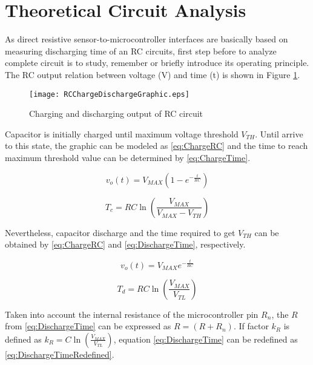 \section{Theoretical Circuit Analysis}\label{S:Res:Analysis}
As direct resistive sensor-to-microcontroller interfaces are basically based on measuring discharging time of an RC circuits, first step before to analyze complete circuit is to study, remember or briefly introduce its operating principle. The RC output relation between voltage (V) and time (t) is shown in Figure \ref{fig:RCChargeDischargeGraphic}.

\begin{figure}[h]
\centering
\texttt{[image: RCChargeDischargeGraphic.eps]}
\caption{Charging and discharging output of RC circuit}
\label{fig:RCChargeDischargeGraphic}
\end{figure}

Capacitor is initially charged until maximum voltage threshold $V_{TH}$. Until arrive to this state, the graphic can be modeled as \eqref{eq:ChargeRC} and the time to reach maximum threshold value can be determined by \eqref{eq:ChargeTime}.

\begin{equation}
\label{eq:ChargeRC}
v_{o}(t) = V_{MAX}(1-e^{-\frac{t}{RC}})
\end{equation}

\begin{equation}
\label{eq:ChargeTime}
T_{c} = RC\ln(\frac{V_{MAX}}{V_{MAX}-V_{TH}})
\end{equation}

Nevertheless, capacitor discharge and the time required to get $V_{TH}$ can be obtained by \eqref{eq:ChargeRC} and \eqref{eq:DischargeTime}, respectively.

\begin{equation}
\label{eq:DischargeRC}
v_{o}(t) = V_{MAX}e^{-\frac{t}{RC}}
\end{equation}

\begin{equation}
\label{eq:DischargeTime}
T_{d} = RC\ln(\frac{V_{MAX}}{V_{TL}})
\end{equation}

Taken into account the internal resistance of the microcontroller pin $R_{n}$, the $R$ from \eqref{eq:DischargeTime} can be expressed as $R=(R+R_{n})$. If factor $k_{R}$ is defined as $k_{R}=C\ln(\frac{V_{MAX}}{V_{TL}})$, equation \eqref{eq:DischargeTime} can be redefined as \eqref{eq:DischargeTimeRedefined}.

